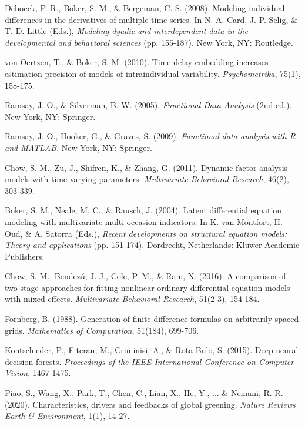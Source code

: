 \documentclass{article}
\begin{document}
\begin{thebibliography}{99}
 Deboeck, P. R., Boker, S. M., \& Bergeman, C. S. (2008). Modeling individual differences in the derivatives of multiple time series. In N. A. Card, J. P. Selig, \& T. D. Little (Eds.), \textit{Modeling dyadic and interdependent data in the developmental and behavioral sciences} (pp. 155-187). New York, NY: Routledge.

 von Oertzen, T., \& Boker, S. M. (2010). Time delay embedding increases estimation precision of models of intraindividual variability. \textit{Psychometrika}, 75(1), 158-175.

 Ramsay, J. O., \& Silverman, B. W. (2005). \textit{Functional Data Analysis} (2nd ed.). New York, NY: Springer.

 Ramsay, J. O., Hooker, G., \& Graves, S. (2009). \textit{Functional data analysis with R and MATLAB}. New York, NY: Springer.

 Chow, S. M., Zu, J., Shifren, K., \& Zhang, G. (2011). Dynamic factor analysis models with time-varying parameters. \textit{Multivariate Behavioral Research}, 46(2), 303-339.

 Boker, S. M., Neale, M. C., \& Rausch, J. (2004). Latent differential equation modeling with multivariate multi-occasion indicators. In K. van Montfort, H. Oud, \& A. Satorra (Eds.), \textit{Recent developments on structural equation models: Theory and applications} (pp. 151-174). Dordrecht, Netherlands: Kluwer Academic Publishers.

 Chow, S. M., Bendezú, J. J., Cole, P. M., \& Ram, N. (2016). A comparison of two-stage approaches for fitting nonlinear ordinary differential equation models with mixed effects. \textit{Multivariate Behavioral Research}, 51(2-3), 154-184.

 Fornberg, B. (1988). Generation of finite difference formulas on arbitrarily spaced grids. \textit{Mathematics of Computation}, 51(184), 699-706.

 Kontschieder, P., Fiterau, M., Criminisi, A., \& Rota Bulo, S. (2015). Deep neural decision forests. \textit{Proceedings of the IEEE International Conference on Computer Vision}, 1467-1475.

 Piao, S., Wang, X., Park, T., Chen, C., Lian, X., He, Y., ... \& Nemani, R. R. (2020). Characteristics, drivers and feedbacks of global greening. \textit{Nature Reviews Earth \& Environment}, 1(1), 14-27.


\end{thebibliography}
\end{document}
